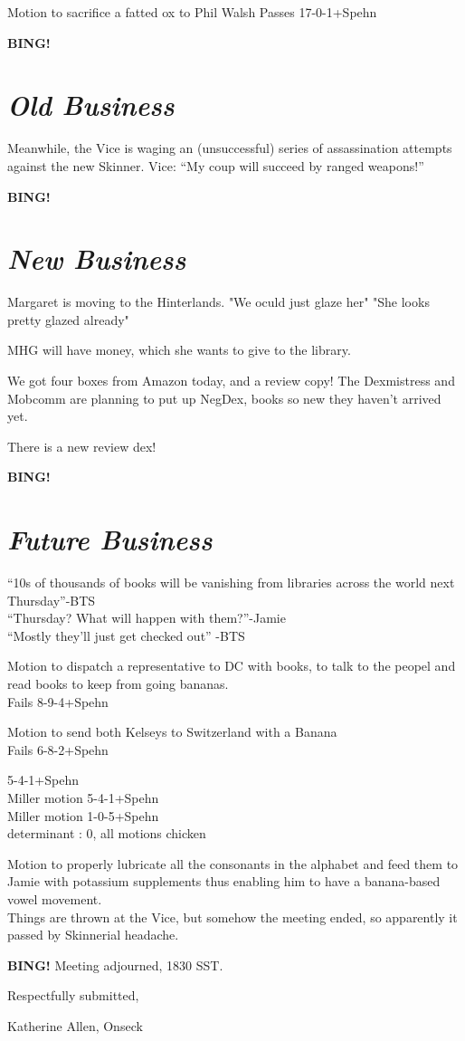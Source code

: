 \documentclass[10pt]{article}
\newcommand{\bing}{{\bf BING!} }
\newcommand{\goto}[1]{\bing \vskip 12pt \section*{{\em{#1}}}}
\begin{document}
Motion to sacrifice a fatted ox to Phil Walsh
Passes 17-0-1+Spehn





\goto{Old Business}

Meanwhile, the Vice is waging an (unsuccessful) series of
assassination attempts against the new Skinner.
Vice: ``My coup will succeed by ranged weapons!''


\goto{New Business}
Margaret is moving to the Hinterlands.
"We oculd just glaze her"
"She looks pretty glazed already"

MHG will have money, which she wants to give to the library.

We got four boxes from Amazon today, and a review copy!
The Dexmistress and Mobcomm are planning to put up NegDex, books so
new they haven't arrived yet.

There is a new review dex!


\goto{Future Business}
``10s of thousands of books will be vanishing from libraries across the
world next Thursday''-BTS\\
``Thursday? What will happen with them?''-Jamie\\
``Mostly they'll just get checked out'' -BTS


Motion to dispatch a representative to DC with books, to talk to the
peopel and read books to keep from going bananas.\\
Fails 8-9-4+Spehn

Motion to send both Kelseys to Switzerland with a Banana\\
Fails 6-8-2+Spehn

5-4-1+Spehn\\
Miller motion 5-4-1+Spehn\\
Miller motion 1-0-5+Spehn\\
determinant : 0, all motions chicken

Motion to properly lubricate all the consonants in the alphabet
and feed them to Jamie with potassium supplements
thus enabling him to have a banana-based vowel movement.\\

Things are thrown at the Vice, but somehow the meeting ended, so
apparently it passed by Skinnerial headache.

\bing
\noindent
Meeting adjourned, 1830 SST.

\vspace{18pt}

\centerline{Respectfully submitted,}
\centerline{Katherine Allen, Onseck}
\end{document}
